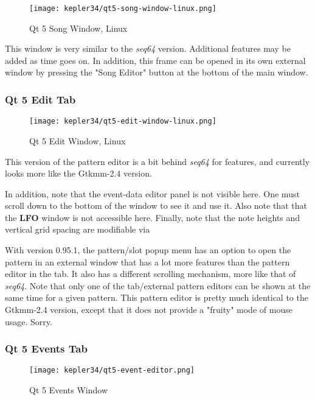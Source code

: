 \begin{figure}[H]
   \centering 
   \texttt{[image: kepler34/qt5-song-window-linux.png]}
   \caption{Qt 5 Song Window, Linux}
   \label{fig:qt5_song_window_linux}
\end{figure}

   This window is very similar to the \textsl{seq64} version.
   Additional features may be added as time goes on.  In addition,
   this frame can be opened in its own external window by
   pressing the "Song Editor" button at the bottom of the main window.

\subsubsection{Qt 5 Edit Tab}
\label{subsubsec:qt_portmidi_qt5_edit_tab}

\begin{figure}[H]
   \centering 
   \texttt{[image: kepler34/qt5-edit-window-linux.png]}
   \caption{Qt 5 Edit Window, Linux}
   \label{fig:qt5_edit_window_linux}
\end{figure}

   This version of the pattern editor is a bit behind
   \textsl{seq64} for features, and currently looks more like the Gtkmm-2.4
   version.

   In addition, note that the event-data editor panel is not visible here.
   One must scroll down to the bottom of the window to see it and use it.
   Also note that that the \textbf{LFO} window is not accessible here.
   Finally, note that the note heights and vertical grid spacing are
   modifiable via

   With version 0.95.1, the pattern/slot popup menu has an option to open the
   pattern in an external window that has a lot more features than the
   pattern editor in the tab.  It also has a different scrolling mechanism,
   more like that of \textsl{seq64}.
   Note that only one of the tab/external pattern
   editors can be shown at the same time for a given pattern.
   This pattern editor is pretty much identical to the Gtkmm-2.4 version,
   except that it does not provide a "fruity" mode of mouse usage.
   Sorry.

\subsubsection{Qt 5 Events Tab}
\label{subsubsec:qt_portmidi_qt5_events_tab}

\begin{figure}[H]
   \centering 
   \texttt{[image: kepler34/qt5-event-editor.png]}
   \caption{Qt 5 Events Window}
   \label{fig:qt5_events_window}
\end{figure}

